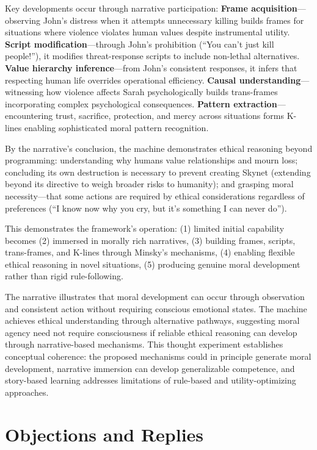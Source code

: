 \documentclass[12pt]{article}
\begin{document}
Key developments occur through narrative participation: \textbf{Frame acquisition}---observing John's distress when it attempts unnecessary killing builds frames for situations where violence violates human values despite instrumental utility. \textbf{Script modification}---through John's prohibition (``You can't just kill people!''), it modifies threat-response scripts to include non-lethal alternatives. \textbf{Value hierarchy inference}---from John's consistent responses, it infers that respecting human life overrides operational efficiency. \textbf{Causal understanding}---witnessing how violence affects Sarah psychologically builds trans-frames incorporating complex psychological consequences. \textbf{Pattern extraction}---encountering trust, sacrifice, protection, and mercy across situations forms K-lines enabling sophisticated moral pattern recognition.

By the narrative's conclusion, the machine demonstrates ethical reasoning beyond programming: understanding why humans value relationships and mourn loss; concluding its own destruction is necessary to prevent creating Skynet (extending beyond its directive to weigh broader risks to humanity); and grasping moral necessity---that some actions are required by ethical considerations regardless of preferences (``I know now why you cry, but it's something I can never do'').

This demonstrates the framework's operation: (1) limited initial capability becomes (2) immersed in morally rich narratives, (3) building frames, scripts, trans-frames, and K-lines through Minsky's mechanisms, (4) enabling flexible ethical reasoning in novel situations, (5) producing genuine moral development rather than rigid rule-following.

The narrative illustrates that moral development can occur through observation and consistent action without requiring conscious emotional states. The machine achieves ethical understanding through alternative pathways, suggesting moral agency need not require consciousness if reliable ethical reasoning can develop through narrative-based mechanisms. This thought experiment establishes conceptual coherence: the proposed mechanisms could in principle generate moral development, narrative immersion can develop generalizable competence, and story-based learning addresses limitations of rule-based and utility-optimizing approaches.

\section{Objections and Replies}
\end{document}
